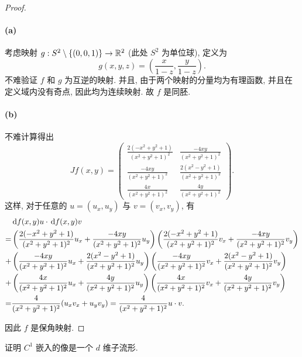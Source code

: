 \documentclass{article}
\begin{document}
\begin{proof}
	\paragraph{(a)} 考虑映射 $g: S^2 \setminus \{(0,0,1)\} \to \mathbb{R}^2$ (此处 $S^2$ 为单位球), 定义为
	\[ g(x,y,z) = \left( \frac{x}{1-z}, \frac{y}{1-z} \right). \]
	不难验证 $f$ 和 $g$ 为互逆的映射. 并且, 由于两个映射的分量均为有理函数, 并且在定义域内没有奇点, 因此均为连续映射. 故 $f$ 是同胚.

	\paragraph{(b)} 不难计算得出
	\[ Jf(x,y) = \begin{pmatrix}
		\frac{2(-x^2 + y^2 + 1)}{(x^2 + y^2 + 1)^2} & \frac{-4xy}{(x^2 + y^2 + 1)^{2}} \\
		\frac{-4xy}{(x^2 + y^2 + 1)^{2}} & \frac{2(x^2 - y^2 + 1)}{(x^2 + y^2 + 1)^{2}} \\
		\frac{4x}{(x^2 + y^2 + 1)^{2}} & \frac{4y}{(x^2 + y^2 + 1)^{2}}
	\end{pmatrix}. \]
	这样, 对于任意的 $u = (u_x, u_y)$ 与 $v = (v_x, v_y)$, 有
	\begin{align*}
		&\,\mathrm{d} f(x,y)u \cdot \,\mathrm{d} f(x,y)v\\
		=& \left( \frac{2(-x^2 + y^2 + 1)}{(x^2 + y^2 + 1)^2}u_x + \frac{-4xy}{(x^2 + y^2 + 1)^{2}} u_y \right) \left( \frac{2(-x^2 + y^2 + 1)}{(x^2 + y^2 + 1)^2}v_x + \frac{-4xy}{(x^2 + y^2 + 1)^{2}} v_y \right) \\
		+& \left( \frac{-4xy}{(x^2 + y^2 + 1)^{2}}u_x + \frac{2(x^2 - y^2 + 1)}{(x^2 + y^2 + 1)^{2}}u_y \right) \left( \frac{-4xy}{(x^2 + y^2 + 1)^{2}}v_x + \frac{2(x^2 - y^2 + 1)}{(x^2 + y^2 + 1)^{2}}v_y \right) \\
		+& \left( \frac{4x}{(x^2 + y^2 + 1)^{2}}u_x + \frac{4y}{(x^2 + y^2 + 1)^{2}}u_y \right) \left( \frac{4x}{(x^2 + y^2 + 1)^{2}}v_x + \frac{4y}{(x^2 + y^2 + 1)^{2}}v_y \right) \\
		=& \frac{4}{(x^2 + y^2 + 1)^{2}}(u_x v_x + u_y v_y) 
		= \frac{4}{(x^2 + y^2 + 1)^{2}} u \cdot v.
	\end{align*}

	因此 $f$ 是保角映射.
\end{proof}



\begin{problem}
  证明 $C^1$ 嵌入的像是一个 $d$ 维子流形.
\end{problem}
\end{document}
